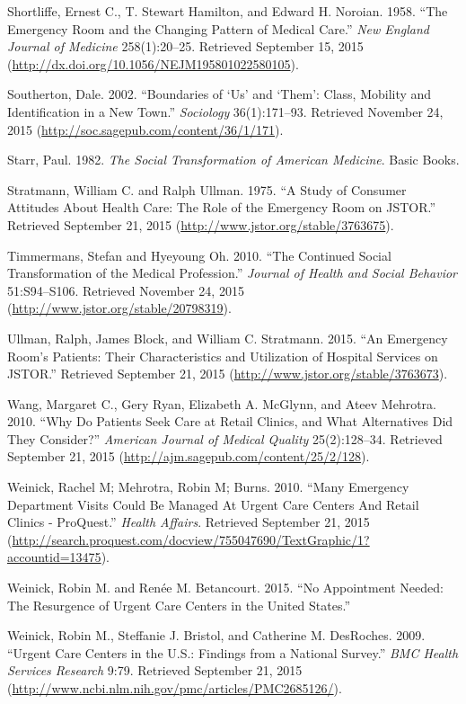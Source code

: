 \documentclass[12pt,twoside]{reedthesis}
\begin{document}
  Shortliffe, Ernest C., T. Stewart Hamilton, and Edward H. Noroian. 1958.
  ``The Emergency Room and the Changing Pattern of Medical Care.''
  \emph{New England Journal of Medicine} 258(1):20--25. Retrieved
  September 15, 2015
  (\url{http://dx.doi.org/10.1056/NEJM195801022580105}).
  
  Southerton, Dale. 2002. ``Boundaries of `Us' and `Them': Class, Mobility
  and Identification in a New Town.'' \emph{Sociology} 36(1):171--93.
  Retrieved November 24, 2015
  (\url{http://soc.sagepub.com/content/36/1/171}).
  
  Starr, Paul. 1982. \emph{The Social Transformation of American
  Medicine}. Basic Books.
  
  Stratmann, William C. and Ralph Ullman. 1975. ``A Study of Consumer
  Attitudes About Health Care: The Role of the Emergency Room on JSTOR.''
  Retrieved September 21, 2015
  (\url{http://www.jstor.org/stable/3763675}).
  
  Timmermans, Stefan and Hyeyoung Oh. 2010. ``The Continued Social
  Transformation of the Medical Profession.'' \emph{Journal of Health and
  Social Behavior} 51:S94--S106. Retrieved November 24, 2015
  (\url{http://www.jstor.org/stable/20798319}).
  
  Ullman, Ralph, James Block, and William C. Stratmann. 2015. ``An
  Emergency Room's Patients: Their Characteristics and Utilization of
  Hospital Services on JSTOR.'' Retrieved September 21, 2015
  (\url{http://www.jstor.org/stable/3763673}).
  
  Wang, Margaret C., Gery Ryan, Elizabeth A. McGlynn, and Ateev Mehrotra.
  2010. ``Why Do Patients Seek Care at Retail Clinics, and What
  Alternatives Did They Consider?'' \emph{American Journal of Medical
  Quality} 25(2):128--34. Retrieved September 21, 2015
  (\url{http://ajm.sagepub.com/content/25/2/128}).
  
  Weinick, Rachel M; Mehrotra, Robin M; Burns. 2010. ``Many Emergency
  Department Visits Could Be Managed At Urgent Care Centers And Retail
  Clinics - ProQuest.'' \emph{Health Affairs}. Retrieved September 21,
  2015
  (\url{http://search.proquest.com/docview/755047690/TextGraphic/1?accountid=13475}).
  
  Weinick, Robin M. and Ren{é}e M. Betancourt. 2015. ``No Appointment
  Needed: The Resurgence of Urgent Care Centers in the United States.''
  
  Weinick, Robin M., Steffanie J. Bristol, and Catherine M. DesRoches.
  2009. ``Urgent Care Centers in the U.S.: Findings from a National
  Survey.'' \emph{BMC Health Services Research} 9:79. Retrieved September
  21, 2015 (\url{http://www.ncbi.nlm.nih.gov/pmc/articles/PMC2685126/}).
  
\end{document}
